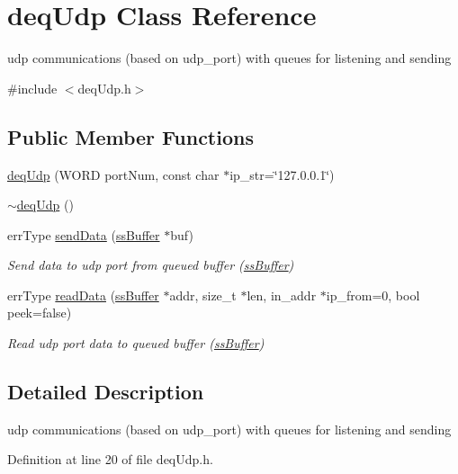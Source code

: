 \hypertarget{classdeqUdp}{
\section{deqUdp Class Reference}
\label{db/dc2/classdeqUdp}
}


udp communications (based on udp\_\-port) with queues for listening and sending  




{\ttfamily \#include $<$deqUdp.h$>$}

\subsection*{Public Member Functions}
\begin{DoxyCompactItemize}
\item 
\hyperlink{classdeqUdp_a33fc931fa8bab88cc576f3db9ce7bfca}{deqUdp} (WORD portNum, const char $\ast$ip\_\-str=\char`\"{}127.0.0.1\char`\"{})
\item 
\hyperlink{classdeqUdp_a8e06694c7ff6b473d04291a68a8b21dc}{$\sim$deqUdp} ()
\item 
errType \hyperlink{classdeqUdp_a1e50010f100ae79d810f8d4889ac361b}{sendData} (\hyperlink{classssBuffer}{ssBuffer} $\ast$buf)
\begin{DoxyCompactList}\small\item\em Send data to udp port from queued buffer (\hyperlink{classssBuffer}{ssBuffer}) \item\end{DoxyCompactList}\item 
errType \hyperlink{classdeqUdp_afd4705cd64f0f137d1f36860761f4865}{readData} (\hyperlink{classssBuffer}{ssBuffer} $\ast$addr, size\_\-t $\ast$len, in\_\-addr $\ast$ip\_\-from=0, bool peek=false)
\begin{DoxyCompactList}\small\item\em Read udp port data to queued buffer (\hyperlink{classssBuffer}{ssBuffer}) \item\end{DoxyCompactList}\end{DoxyCompactItemize}


\subsection{Detailed Description}
udp communications (based on udp\_\-port) with queues for listening and sending 

Definition at line 20 of file deqUdp.h.



